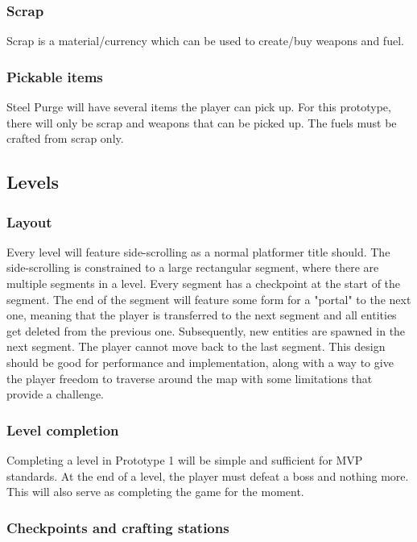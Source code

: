 \documentclass[../Main.tex]{subfiles}
\begin{document}
\subsubsection{Scrap}

Scrap is a material/currency which can be used to create/buy weapons and fuel. 

\subsubsection{Pickable items}

Steel Purge will have several items the player can pick up. For this prototype, there will only be scrap and weapons that can be picked up. The fuels must be crafted from scrap only.

\subsection{Levels}

\subsubsection{Layout}

Every level will feature side-scrolling as a normal platformer title should. The side-scrolling is constrained to a large rectangular segment, where there are multiple segments in a level. Every segment has a checkpoint at the start of the segment. The end of the segment will feature some form for a "portal" to the next one, meaning that the player is transferred to the next segment and all entities get deleted from the previous one. Subsequently, new entities are spawned in the next segment. The player cannot move back to the last segment. This design should be good for performance and implementation, along with a way to give the player freedom to traverse around the map with some limitations that provide a challenge. 

\subsubsection{Level completion}

Completing a level in Prototype 1 will be simple and sufficient for MVP standards. At the end of a level, the player must defeat a boss and nothing more. This will also serve as completing the game for the moment. 

\subsubsection{Checkpoints and crafting stations}
\end{document}
